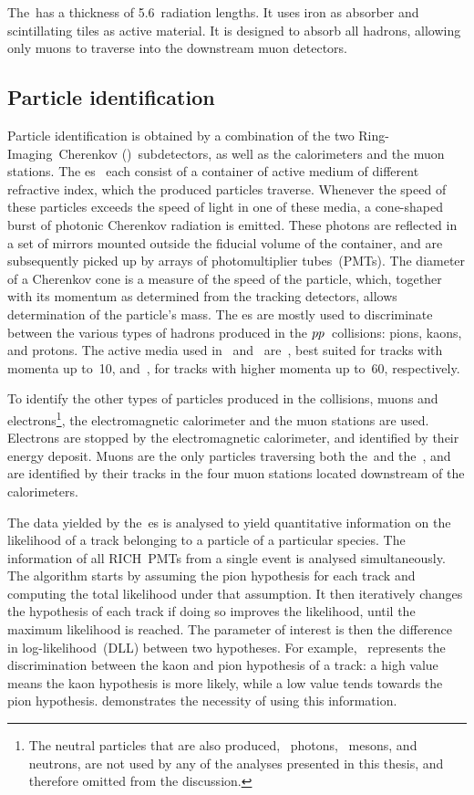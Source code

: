 The~\hcal has a thickness of \num{5.6}~radiation lengths.
It uses iron as absorber and scintillating tiles as active material.
It is designed to absorb all hadrons, allowing only muons to traverse into the downstream muon detectors.

\subsection{Particle identification}
\label{sec:det_pid}

Particle identification is obtained by a combination of the two Ring-Imaging~Cherenkov (\rich)~subdetectors, as well as the calorimeters and the muon stations.
The \rich{}es~\cite{LHCb-DP-2012-003} each consist of a container of active medium of different refractive index, which the produced particles traverse.
Whenever the speed of these particles exceeds the speed of light in one of these media, a cone-shaped burst of photonic Cherenkov radiation is emitted.
These photons are reflected in a set of mirrors mounted outside the fiducial volume of the container, and are subsequently picked up by arrays of photomultiplier tubes~(PMTs).
The diameter of a Cherenkov cone is a measure of the speed of the particle, which, together with its momentum as determined from the tracking detectors, allows determination of the particle's mass.
The \rich{}es are mostly used to discriminate between the various types of hadrons produced in the \({{p}{p}}\)~collisions: pions, kaons, and protons.
The active media used in~ and~ are~\cfourften, best suited for tracks with momenta up to~\SI{10}{\GeVc}, and~\cffour, for tracks with higher momenta up to~\SI{60}{\GeVc}, respectively.

To identify the other types of particles produced in the collisions, muons and electrons\footnote{The neutral particles that are also produced, \eg~photons, \piz~mesons, and neutrons, are not used by any of the analyses presented in this thesis, and therefore omitted from the discussion.}, the electromagnetic calorimeter and the muon stations are used.
Electrons are stopped by the electromagnetic calorimeter, and identified by their energy deposit.
Muons are the only particles traversing both the~\ecal and the~\hcal, and are identified by their tracks in the four muon stations located downstream of the calorimeters.

The data yielded by the~\rich{}es is analysed to yield quantitative information on the likelihood of a track belonging to a particle of a particular species.
The information of all RICH~PMTs from a single event is analysed simultaneously.
The algorithm starts by assuming the pion hypothesis for each track and computing the total likelihood under that assumption.
It then iteratively changes the hypothesis of each track if doing so improves the likelihood, until the maximum likelihood is reached.
The parameter of interest is then the difference in log-likelihood~(DLL) between two hypotheses.
For example, \dllkpi~represents the discrimination between the kaon and pion hypothesis of a track: a high value means the kaon hypothesis is more likely, while a low value tends towards the pion hypothesis.
 demonstrates the necessity of using this information.

